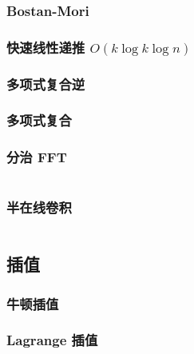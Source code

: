 \documentclass[a4paper, twoside]{article}
\begin{document}
\begin{multicols}{2}

				\subsubsection[Bostan-Mori（求多项式分式第 n 项）]{Bostan-Mori}
					\label{BostanMori}
					
				
				\subsubsection{快速线性递推 $O(k\log k\log n)$}
					\label{LinearRecurrence}
					

				\subsubsection{多项式复合逆}
					\label{PolyCompositeInverse}
					
				
				\subsubsection{多项式复合}
					

				\subsubsection{分治 FFT}
					\inputminted{cpp}{../src/math/分治FFT.cpp}

				\subsubsection{半在线卷积}
					\inputminted{cpp}{../src/math/半在线卷积.cpp}

			\subsection{插值}
				\subsubsection{牛顿插值}
					

				\subsubsection[拉格朗日（Lagrange）插值]{Lagrange 插值}
					
				

\end{multicols}
\end{document}
